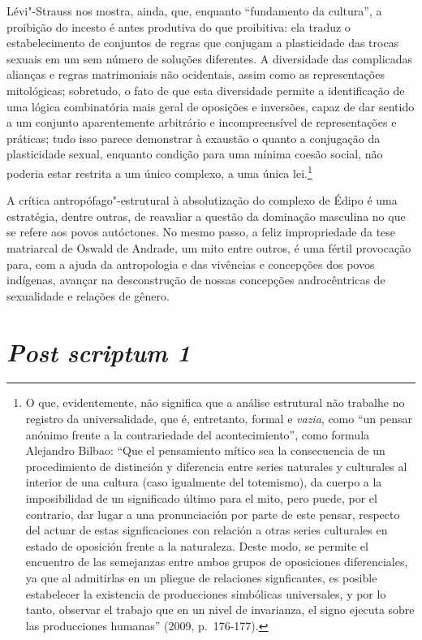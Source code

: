 Lévi"-Strauss nos mostra, ainda, que, enquanto ``fundamento da cultura'',
a proibição do incesto é antes produtiva do que proibitiva: ela traduz o
estabelecimento de conjuntos de regras que conjugam a plasticidade das
trocas sexuais em um sem número de soluções diferentes. A diversidade
das complicadas alianças e regras matrimoniais não ocidentais, assim
como as representações mitológicas; sobretudo, o fato de que esta
diversidade permite a identificação de uma lógica combinatória mais
geral de oposições e inversões, capaz de dar sentido a um conjunto
aparentemente arbitrário e incompreensível de representações e práticas;
tudo isso parece demonstrar à exaustão o quanto a conjugação da
plasticidade sexual, enquanto condição para uma mínima coesão social,
não poderia estar restrita a um único complexo, a uma única
lei.\footnote{O que, evidentemente, não significa que a análise
  estrutural não trabalhe no registro da universalidade, que é,
  entretanto, formal e \emph{vazia}, como ``un pensar anónimo frente a
  la contrariedade del acontecimiento'', como formula Alejandro Bilbao:
  ``Que el pensamiento mítico sea la consecuencia de un procedimiento de
  distinción y diferencia entre series naturales y culturales al
  interior de una cultura (caso igualmente del totemismo), da cuerpo a
  la imposibilidad de un significado último para el mito, pero puede,
  por el contrario, dar lugar a una pronunciación por parte de este
  pensar, respecto del actuar de estas signficaciones con relación a
  otras series culturales en estado de oposición frente a la naturaleza.
  Deste modo, se permite el encuentro de las semejanzas entre ambos
  grupos de oposiciones diferenciales, ya que al admitirlas en un
  pliegue de relaciones signficantes, es posible estabelecer la
  existencia de producciones simbólicas universales, y por lo tanto,
  observar el trabajo que en un nivel de invarianza, el signo ejecuta
  sobre las producciones humanas'' (2009, p.~176-177).}

A crítica antropófago"-estrutural à absolutização do complexo de Édipo é
uma estratégia, dentre outras, de reavaliar a questão da dominação
masculina no que se refere aos povos autóctones. No mesmo passo, a feliz
impropriedade da tese matriarcal de Oswald de Andrade, um mito entre
outros, é uma fértil provocação para, com a ajuda da antropologia e das
vivências e concepções dos povos indígenas, avançar na desconstrução de
nossas concepções androcêntricas de sexualidade e relações de gênero.

\section{\emph{Post scriptum 1}}

